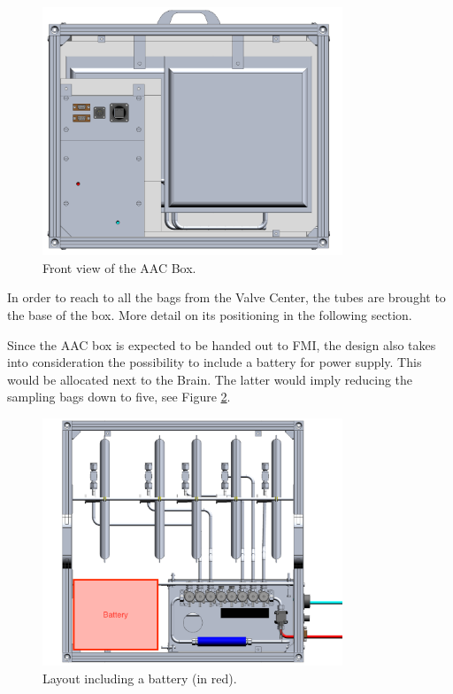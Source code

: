 \begin{figure}[H]
    \centering
    \includegraphics[width=0.8\textwidth]{4-experiment-design/img/Mechanical/AAC_front_view.png}
    \caption{Front view of the AAC Box.}
    \label{front_aac}
\end{figure}

In order to reach to all the bags from the Valve Center, the tubes are brought to the base of the box. More detail on its positioning in the following section. 

\smallskip
Since the AAC box is expected to be handed out to FMI, the design also takes into consideration the possibility to include a battery for power supply. This would be allocated next to the Brain. The latter would imply reducing the sampling bags down to five, see Figure \ref{battery_distribution}.


\begin{figure}[H]
    \centering
    \includegraphics[width=0.8\textwidth]{4-experiment-design/img/Mechanical/Battery_Top_View.png}
    \caption{Layout including a battery (in red).}
    \label{battery_distribution}
\end{figure}


